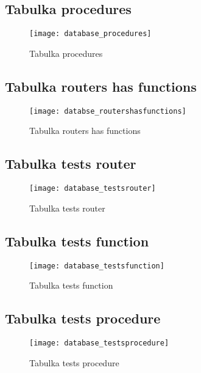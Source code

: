 \subsection{Tabulka procedures}

\begin{figure}[h]
  \centering
  \texttt{[image: database\_procedures]}
  \caption{Tabulka procedures}
  \label{fig:database_procedures}
\end{figure}

\subsection{Tabulka routers has functions}

\begin{figure}[h]
  \centering
  \texttt{[image: databse\_routershasfunctions]}
  \caption{Tabulka routers has functions}
  \label{fig:databse_routershasfunctions}
\end{figure}

\subsection{Tabulka tests router}

\begin{figure}[h]
  \centering
  \texttt{[image: database\_testsrouter]}
  \caption{Tabulka tests router}
  \label{fig:database_testsrouter}
\end{figure}

\subsection{Tabulka tests function}

\begin{figure}[h]
  \centering
  \texttt{[image: database\_testsfunction]}
  \caption{Tabulka tests function}
  \label{fig:database_testsfunction}
\end{figure}

\subsection{Tabulka tests procedure}

\begin{figure}[h]
  \centering
  \texttt{[image: database\_testsprocedure]}
  \caption{Tabulka tests procedure}
  \label{fig:database_testsprocedure}
\end{figure}

